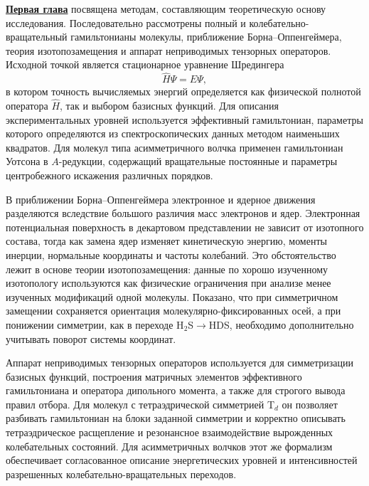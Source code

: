 \underline{\textbf{Первая глава}} посвящена методам, составляющим теоретическую основу исследования.
Последовательно рассмотрены полный и колебательно-вращательный гамильтонианы молекулы, приближение
Борна--Оппенгеймера, теория изотопозамещения и аппарат неприводимых тензорных операторов. Исходной
точкой является стационарное уравнение Шредингера
\begin{equation}
    \widehat{H}\Psi=E\Psi,
\end{equation}
в котором точность вычисляемых энергий определяется как физической полнотой оператора
$\widehat{H}$, так и выбором базисных функций. Для описания экспериментальных уровней используется
эффективный гамильтониан, параметры которого определяются из спектроскопических данных методом
наименьших квадратов. Для молекул типа асимметричного волчка применен гамильтониан Уотсона в
$A$-редукции, содержащий вращательные постоянные и параметры центробежного искажения различных
порядков.

В приближении Борна--Оппенгеймера электронное и ядерное движения разделяются вследствие большого
различия масс электронов и ядер. Электронная потенциальная поверхность в декартовом представлении не
зависит от изотопного состава, тогда как замена ядер изменяет кинетическую энергию, моменты инерции,
нормальные координаты и частоты колебаний. Это обстоятельство лежит в основе теории
изотопозамещения: данные по хорошо изученному изотопологу используются как физические ограничения
при анализе менее изученных модификаций одной молекулы. Показано, что при симметричном замещении
сохраняется ориентация молекулярно-фиксированных осей, а при понижении симметрии, как в переходе
H$_2$S$\rightarrow$HDS, необходимо дополнительно учитывать поворот системы координат.

Аппарат неприводимых тензорных операторов используется для симметризации базисных функций,
построения матричных элементов эффективного гамильтониана и оператора дипольного момента, а также
для строгого вывода правил отбора. Для молекул с тетраэдрической симметрией T$_d$ он позволяет
разбивать гамильтониан на блоки заданной симметрии и корректно описывать тетраэдрическое расщепление
и резонансное взаимодействие вырожденных колебательных состояний. Для асимметричных волчков этот же
формализм обеспечивает согласованное описание энергетических уровней и интенсивностей разрешенных
колебательно-вращательных переходов.


